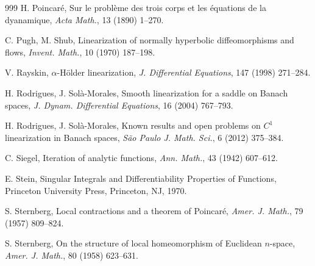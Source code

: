\documentclass[reqno]{amsart}
\numberwithin{equation}{section}
\begin{document}
\begin{thebibliography}{999}
H. Poincar\'{e}, Sur le probl\`{e}me des trois corps et les \'{e}quations de la dyanamique, {\em Acta Math.}, 13 (1890) 1--270.

C. Pugh, M. Shub,  Linearization of normally hyperbolic diffeomorphisms and flows, {\em Invent. Math.}, 10 (1970) 187--198.

V. Rayskin, $\alpha$-H\"{o}lder linearization, {\em J. Differential Equations}, 147 (1998) 271--284.


H. Rodrigues, J. Sol\`{a}-Morales, Smooth linearization for a saddle on Banach spaces, {\em J. Dynam. Differential Equations}, 16
(2004) 767--793.

H. Rodrigues, J. Sol\`{a}-Morales, Known results and open problems on $C^1$
linearization in Banach spaces, {\em S\~{a}o Paulo J. Math. Sci.}, 6 (2012)  375--384.



%


C. Siegel, Iteration of analytic functions, {\em Ann.  Math.},  43 (1942) 607--612.


E.  Stein, Singular Integrals and Differentiability Properties of Functions, Princeton University Press,  Princeton,
NJ, 1970.


S. Sternberg, Local contractions and a theorem of Poincar\'{e}, {\em Amer. J. Math.}, 79 (1957) 809--824.

S. Sternberg, On the structure of local homeomorphism of Euclidean $n$-space, {\em Amer. J. Math.}, 80 (1958) 623--631.




\end{thebibliography}
\end{document}
